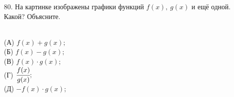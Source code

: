 80. На картинке изображены графики функций $f(x),\ g(x)$ и ещё одной. Какой?
Объясните.\\
\begin{figure}[ht!]
\end{figure}\\
(А) $f(x)+g(x);$\\
(Б) $f(x)-g(x);$\\
(В) $f(x)\cdot g(x);$\\
(Г) $\cfrac{f(x)}{g(x)};$\\
(Д) $-f(x)\cdot g(x);$\\
